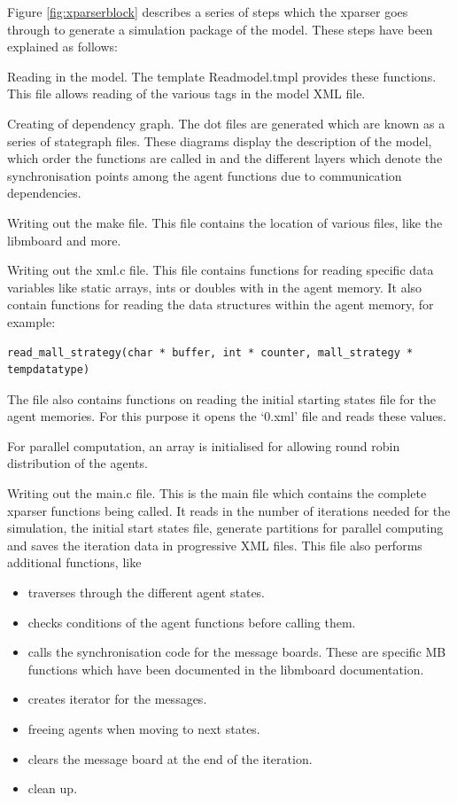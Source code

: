 \documentclass[a4paper,11pt]{article}
\newenvironment{mylisting}
{\begin{list}{}{\setlength{\leftmargin}{1em}}\item\small\bfseries}
{\end{list}}
\begin{document}
Figure \ref{fig:xparserblock} describes a series of steps which the
xparser goes through to generate a simulation package of the model.
These steps have been explained as follows:
\begin{enumerate}
\item Reading in the model. The template Readmodel.tmpl provides these functions. This file allows reading
of the various tags in the model XML file.
\item Creating of dependency graph. The dot files are generated which are known as a series of stategraph files.
These diagrams display the description of the model, which order the
functions are called in and the different layers which denote the
synchronisation points among the agent functions due to
communication dependencies.
\item Writing out the make file. This file contains the location of various files, like the libmboard and more.
\item Writing out the xml.c file. This file contains functions for reading specific data variables like static
arrays, ints or doubles with in the agent memory. It also contain
functions for reading the data structures within the agent memory,
for example:

\begin{mylisting}
\begin{verbatim}
read_mall_strategy(char * buffer, int * counter, mall_strategy *
tempdatatype)
\end{verbatim}
\end{mylisting}

The file also contains functions on reading the initial starting
states file for the agent memories. For this purpose it opens the
`0.xml' file and reads these values.

For parallel computation, an array is initialised for allowing round
robin distribution of the agents.

\item Writing out the main.c file. This is the main file which contains the complete xparser functions
being called. It reads in the number of iterations needed for the
simulation, the initial start states file, generate partitions for
parallel computing and saves the iteration data in progressive XML
files. This file also performs additional functions, like

\begin{itemize}
\item traverses through the different agent states.
\item checks conditions of the agent functions before calling them.
\item calls the synchronisation code for the message boards. These are specific MB functions which have been documented in the libmboard documentation.
\item creates iterator for the messages.
\item freeing agents when moving to next states.
\item clears the message board at the end of the iteration.
\item clean up.
\end{itemize}


\end{enumerate}
\end{document}
